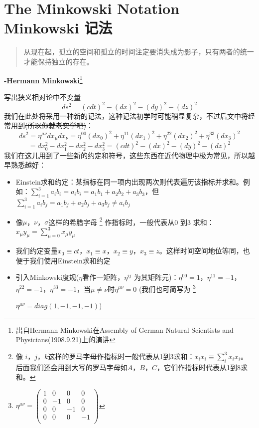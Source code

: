 \section[Minkowski记法]{The Minkowski Notation Minkowski 记法}
\label{sec2.4}
\begin{quote}
从现在起，孤立的空间和孤立的时间注定要消失成为影子，只有两者的统一才能保持独立的存在。
\end{quote}
\begin{flushright}
  {\bf{-Hermann Minkowski}}\footnote{出自Hermann Minkowski在Assembly of German Natural Scientists and Physicians(1908.9.21)上的演讲}
\end{flushright}
写出狭义相对论中不变量
\begin{equation}\label{eq2.23}
 ds^2=(cdt)^2-(dx)^2-(dy)^2-(dz)^2
\end{equation}
我们在此处将采用一种新的记法，这种记法初学时可能稍显复杂，不过后文中将经常用到\sout{(所以你就老实学吧)}：
\[
 ds^2=\eta^{\mu\nu}dx_\mu dx_\nu
  =\eta^{00}(dx_0)^2+\eta^{11}(dx_1)^2+\eta^{22}(dx_2)^2+\eta^{33}(dx_3)^2
\]
\begin{equation}\label{eq2.24}
 =dx_0^2-dx_1^2-dx_2^2-dx_3^2=(cdt)^2-(dx)^2-(dy)^2-(dz)^2
\end{equation}
我们在这儿用到了一些新的约定和符号，这些东西在近代物理中极为常见，所以越早熟悉越好：
\begin{itemize}
  \item Einstein求和约定：某指标在同一项内出现两次则代表遍历该指标并求和。例如：$\sum_{i=1}^3a_i b_i =a_i b_i=a_1 b_1 +a_2 b_2 +a_3 b_3$，但$\sum_{i=1}^3a_i b_j=a_1 b_j +a_2 b_j +a_3 b_j\neq a_i b_j$
  \item 像$\mu$，$\nu$，$\sigma$这样的希腊字母
  \footnote{像 $i$，$j$，$k$这样的罗马字母作指标时一般代表从1到3求和：$x_i x_i \equiv \sum_i^3 x_i x_i$。 后面我们还会用到大写的罗马字母如$A$，$B$，$C$，它们作指标时代表从1到8求和。} 作指标时，一般代表从0 到3 求和：$x_\mu y_\mu=\sum_{\mu=0}^3 x_\mu y_\mu $
  \item 我们约定变量$x_0\equiv ct$，$x_1\equiv x$，$x_2\equiv y$，$x_3\equiv z$。这样时间空间地位等同，也便于我们使用Einstein求和约定
  \item 引入Minkowski度规($\eta$看作一矩阵，$\eta^{ij}$ 为其矩阵元)：$\eta^{00}=1$，$\eta^{11}=-1$，$\eta^{22}=-1$，$\eta^{33}=-1$，当$\mu \neq \nu$时$\eta^{\mu\nu}=0$  (我们也可简写为
  \footnote{$\eta^{\mu\nu}= \left(
       \begin{array}{cccc}
        1 & 0 & 0 & 0 \\
         0 & -1 & 0 & 0 \\
          0 & 0 & -1 & 0 \\
          0 & 0 & 0  & -1\\
        \end{array}\right)$ }


      $\eta^{\mu\nu}=diag(1,-1,-1,-1)$)
\end{itemize}


